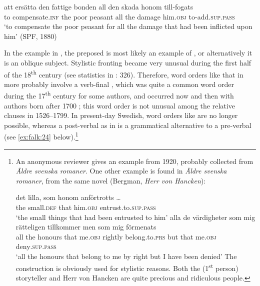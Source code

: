 \documentclass[output=paper]{langscibook}
\begin{document}
\ex\label{ex:falk:22d}
\gll att    ersätta        den  fattige  bonden    all  den  skada    honom till-fogats\\
      to    compensate.\textsc{inf}  the  poor    peasant  all  the  damage  him.\textsc{obj}         to-add\textsc{.sup.pass}\\
\glt ‘to compensate the poor peasant for all the damage that had been inflicted upon       him’ (SPF, 1880)
\z
\z

In the  example in , the preposed  is most likely an example of , or alternatively it is an oblique subject. Stylistic fronting became very unusual during the first half of the 18\textsuperscript{th} century (see statistics in \citealt{Falk1993}: 326). Therefore, word orders like that in  more probably involve a verb-final , which was quite a common word order during the 17\textsuperscript{th} century for some authors, and occurred now and then with authors born after 1700 \citep{Platzack1983}; this word order is not unusual among the relative clauses in 1526–1799. In present-day Swedish, word orders like  are no longer possible, whereas a post-verbal  as in  is a grammatical alternative to a pre-verbal  (see \ref{ex:falk:24} below).\footnote{An anonymous reviewer gives an example from 1920, probably collected from \textit{Äldre svenska romaner}. One other example is found in \textit{Äldre svenska romaner}, from the same novel (Bergman, \textit{Herr von Hancken}):

\ea \gll det  lilla,    som  honom    anförtrotts …\\
        the  small.\textsc{def}  that  him.\textsc{obj}  entrust.to.\textsc{sup.pass}\\
        \glt  ‘the small things that had been entrusted to him’
\ex  \gll alla de  värdigheter  som  mig    rätteligen  tillkommer    men  som  mig    förmenats\\
         all the  honours    that  me.\textsc{obj}  rightly    belong.to.\textsc{prs}  but  that  me.\textsc{obj}  deny\textsc{.sup.pass}\\
       \glt ‘all the honours that belong to me by right but I have been denied’
\z The construction is obviously used for stylistic reasons. Both the (1\textsuperscript{st} person) storyteller and Herr von Hancken are quite precious and ridiculous people.}
\end{document}
